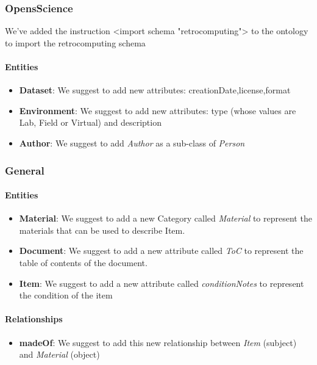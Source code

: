 \subsubsection{OpensScience}

We've added the instruction <import schema "retrocomputing"> to the ontology to import the retrocomputing schema

\paragraph{Entities}
\begin{itemize}
    \item \textbf{Dataset}: We suggest to add new attributes: creationDate,license,format
    \item \textbf{Environment}: We suggest to add new attributes: type (whose values are Lab, Field or Virtual) and description
    \item \textbf{Author}: We suggest to add \textit{Author} as a sub-class of \textit{Person}
\end{itemize}

\subsubsection{General}
\paragraph{Entities}
\begin{itemize}
    \item \textbf{Material}: We suggest to add a new Category called \textit{Material} to represent the materials that can be used to describe Item.
    \item \textbf{Document}: We suggest to add a new attribute called \textit{ToC} to represent the table of contents of the document.
    \item \textbf{Item}: We suggest to add a new attribute called \textit{conditionNotes} to represent the condition of the item
\end{itemize}
\paragraph{Relationships}
\begin{itemize}
    \item \textbf{madeOf}: We suggest to add this new relationship between \textit{Item} (subject) and \textit{Material} (object)
\end{itemize}




